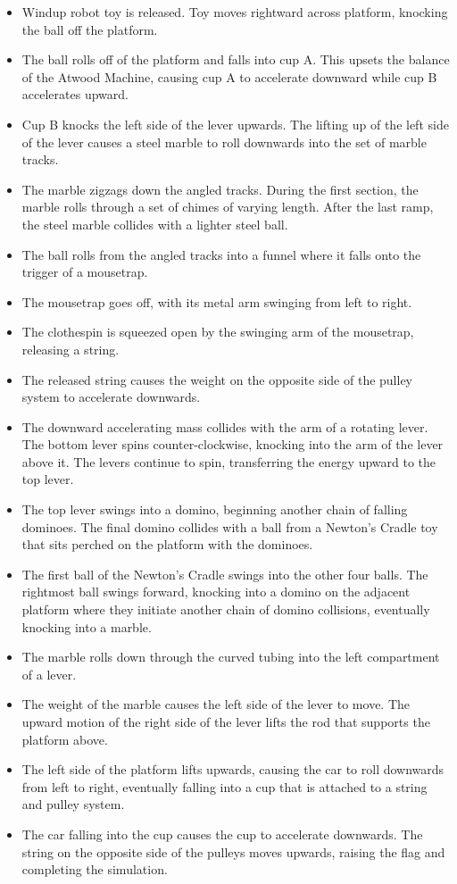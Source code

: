 \documentclass[11pt, a4paper]{article}
\begin{document}
\begin{itemize}
\item Windup robot toy is released. Toy moves rightward across platform, knocking the ball off the platform.
\item The ball rolls off of the platform and falls into cup A. This upsets the balance of the Atwood Machine,
causing cup A to accelerate downward while cup B accelerates upward.
\item Cup B knocks the left side of the lever upwards. The lifting up of the left side of the lever causes a steel
marble to roll downwards into the set of marble tracks.
\item The marble zigzags down the angled tracks. During the first section, the marble rolls through a set of
chimes of varying length. After the last ramp, the steel marble collides with a lighter steel ball.
\item The ball rolls from the angled tracks into a funnel where it falls onto the trigger of a mousetrap.
\item The mousetrap goes off, with its metal arm swinging from left to right.
\item The clothespin is squeezed open by the swinging arm of the mousetrap, releasing a string.
\item The released string causes the weight on the opposite side of the pulley system to accelerate downwards.
\item The downward accelerating mass collides with the arm of a rotating lever. The bottom lever spins
counter-clockwise, knocking into the arm of the lever above it. The levers continue to spin, transferring
the energy upward to the top lever.
\item The top lever swings into a domino, beginning another chain of falling dominoes. The final domino
collides with a ball from a Newton’s Cradle \cite{RHK} toy that sits perched on the platform with the dominoes.
\item The first ball of the Newton’s Cradle swings into the other four balls. The rightmost ball swings
forward, knocking into a domino on the adjacent platform where they initiate another chain of domino
collisions, eventually knocking into a marble.
\item The marble rolls down through the curved tubing into the left compartment of a lever.
\item The weight of the marble causes the left side of the lever to move. The upward motion of the right side
of the lever lifts the rod that supports the platform above.
\item The left side of the platform lifts upwards, causing the car to roll downwards from left to right,
eventually falling into a cup that is attached to a string and pulley system.
\item The car falling into the cup causes the cup to accelerate downwards. The string on the opposite side of
the pulleys moves upwards, raising the flag and completing the simulation.

\end{itemize}
\end{document}

